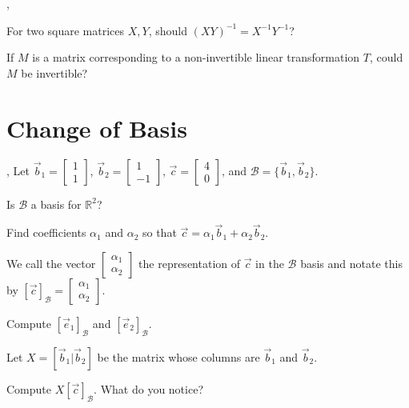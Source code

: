 \documentclass[letter]{article}
\newcommand{\R}{\mathbb{R}}
\newcommand{\mat}[1]{\begin{bmatrix}#1\end{bmatrix}}
\begin{document}
	\sep
	\vspace{-.8cm}
	\begin{Enum}
		\item For two square matrices $X,Y$, should $(XY)^{-1}=X^{-1}Y^{-1}$?
		\item If $M$ is a matrix corresponding to a non-invertible linear transformation $T$,
			could $M$ be invertible?
	\end{Enum}

	
\section*{Change of Basis}
	\sep
	Let $\vec b_1=\mat{1\\1}$, $\vec b_2=\mat{1\\-1}$, $\vec c=\mat{4\\0}$, and $\mathcal B=\{\vec b_1,\vec b_2\}$.
	\begin{Enum}
		\item Is $\mathcal B$ a basis for $\R^2$?
		\item Find coefficients $\alpha_1$ and $\alpha_2$ so that $\vec c=\alpha_1\vec b_1+\alpha_2\vec b_2$.
	\end{Enum}
	We call the vector $\mat{\alpha_1\\\alpha_2}$ the representation of $\vec c$ in the $\mathcal B$ basis and notate
	this by $[\vec c]_{\mathcal B}=\mat{\alpha_1\\\alpha_2}$.
	\begin{Enum}[resume]
		\item Compute $[\vec e_1]_{\mathcal B}$ and $[\vec e_2]_{\mathcal B}$.
	\end{Enum}
	Let $X=[\vec b_1|\vec b_2]$ be the matrix whose columns are $\vec b_1$ and $\vec b_2$.
	\begin{Enum}[resume]
		\item Compute $X[\vec c]_{\mathcal B}$.  What do you notice?
	\end{Enum}
\end{document}
